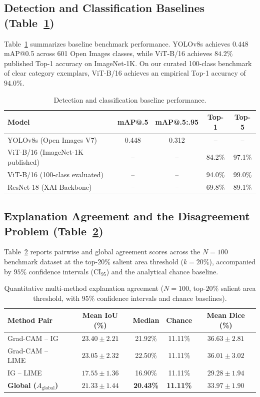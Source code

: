 \documentclass[journal,10pt,twocolumn]{IEEEtran}
\begin{document}
\subsection{Detection and Classification Baselines (Table~\ref{tab:baselines})}
Table~\ref{tab:baselines} summarizes baseline benchmark performance. YOLOv8s achieves $0.448$ mAP@0.5 across 601 Open Images classes, while ViT-B/16 achieves $84.2\%$ published Top-1 accuracy on ImageNet-1K. On our curated 100-class benchmark of clear category exemplars, ViT-B/16 achieves an empirical Top-1 accuracy of $94.0\%$.

\begin{table}[t]
\centering
\caption{Detection and classification baseline performance.}
\label{tab:baselines}
\begin{tabular}{lcccc}
\toprule
\textbf{Model} & \textbf{mAP@.5} & \textbf{mAP@.5:.95} & \textbf{Top-1} & \textbf{Top-5} \\
\midrule
YOLOv8s (Open Images V7) & 0.448 & 0.312 & -- & -- \\
ViT-B/16 (ImageNet-1K published) & -- & -- & 84.2\% & 97.1\% \\
ViT-B/16 (100-class evaluated) & -- & -- & 94.0\% & 99.0\% \\
ResNet-18 (XAI Backbone) & -- & -- & 69.8\% & 89.1\% \\
\bottomrule
\end{tabular}
\end{table}

\subsection{Explanation Agreement and the Disagreement Problem (Table~\ref{tab:agreement})}
Table~\ref{tab:agreement} reports pairwise and global agreement scores across the $N=100$ benchmark dataset at the top-20\% salient area threshold ($k=20\%$), accompanied by $95\%$ confidence intervals ($\text{CI}_{95}$) and the analytical chance baseline.

\begin{table}[t]
\centering
\caption{Quantitative multi-method explanation agreement ($N=100$, top-$20\%$ salient area threshold, with $95\%$ confidence intervals and chance baselines).}
\label{tab:agreement}
\begin{tabular}{lcccc}
\toprule
\textbf{Method Pair} & \textbf{Mean IoU (\%)} & \textbf{Median} & \textbf{Chance} & \textbf{Mean Dice (\%)} \\
\midrule
Grad-CAM -- IG & $23.40 \pm 2.21$ & 21.92\% & 11.11\% & $36.63 \pm 2.81$ \\
Grad-CAM -- LIME & $23.05 \pm 2.32$ & 22.50\% & 11.11\% & $36.01 \pm 3.02$ \\
IG -- LIME & $17.55 \pm 1.36$ & 16.90\% & 11.11\% & $29.28 \pm 1.94$ \\
\midrule
\textbf{Global ($A_{\text{global}}$)} & $\mathbf{21.33 \pm 1.44}$ & \textbf{20.43\%} & \textbf{11.11\%} & $\mathbf{33.97 \pm 1.90}$ \\
\bottomrule
\end{tabular}
\end{table}
\end{document}
